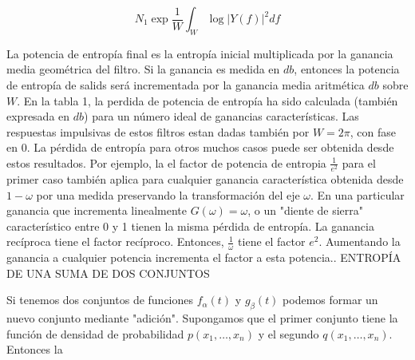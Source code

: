 \begin{equation}
N_{1}\exp \frac{1}{W}\int_{W}^{\:}\log \left | Y\left ( f \right ) \right |^{2}df
\end{equation}

La potencia de entrop\'ia final es la entrop\'ia inicial multiplicada por la ganancia media geom\'etrica del filtro. Si la ganancia es medida en $db$, entonces la potencia de entrop\'ia de salids ser\'a incrementada por la ganancia media aritm\'etica $db$ sobre $W$.\newline
En la tabla 1, la perdida de potencia de entrop\'ia ha sido calculada (tambi\'en expresada en $db$) para un n\'umero ideal de ganancias caracter\'isticas. Las respuestas impulsivas de estos filtros estan dadas tambi\'en por $W = 2 \pi$, con fase en 0.\newline
La p\'erdida de entrop\'ia para otros muchos casos puede ser obtenida desde estos resultados. Por ejemplo, la el factor de potencia de entrop\;ia $\frac{1}{e^{2}}$ para el primer caso tambi\'en aplica para cualquier ganancia caracter\'istica obtenida desde $1-\omega$ por una medida preservando la transformaci\'on del eje $\omega$. En una particular ganancia que incrementa linealmente $G \left (\omega  \right) = \omega$, o un "diente de sierra" caracter\'istico entre 0 y 1 tienen la misma p\'erdida de entrop\'ia. La ganancia rec\'iproca tiene el factor rec\'iproco. Entonces, $\frac{1}{\omega}$ tiene el factor $e^{2}$. Aumentando la ganancia a cualquier potencia incrementa el factor a esta potencia.\newline \newline {}. ENTROP\'IA DE UNA SUMA DE DOS CONJUNTOS\newline 

Si tenemos dos conjuntos de funciones $f_{\alpha} \left( t \right)$ y $g_{\beta} \left( t \right)$ podemos formar un nuevo conjunto mediante "adici\'on". Supongamos que el primer conjunto  tiene la funci\'on de densidad de probabilidad $p \left( x_{1}, \dots , x_{n} \right)$ y el segundo $q \left( x_{1}, \dots , x_{n} \right)$. Entonces la

